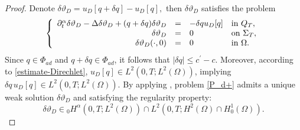 \documentclass[a4paper,12pt,reqno,natbib]{amsart}
\begin{document}
\begin{proof}
Denote $\delta \vartheta_{D}=u_D[q+\delta q]-u_D[q],$
then $\delta \vartheta_{D}$ satisfies the problem
\begin{eqnarray} \label{P_d+}
\left\{
  \begin{array}{rcll}
    \partial^\alpha _{t} \delta \vartheta_{D}   -\Delta \delta \vartheta_{D} +(q+\delta q)\delta \vartheta_{D}&=&-\delta q u_D[q]&\hbox{in}\ Q_T, \\
    \displaystyle \delta \vartheta_{D} &=&0 &\hbox{on}\  \Sigma_T, \\
    \displaystyle \delta \vartheta_{D} (\cdot,0)&=&0  &\hbox{in}\ \Omega.
  \end{array}
\right.
\end{eqnarray}
Since $q\in \Phi_{ad}$ and $q + \delta q \in \Phi_{ad}$, it follows that $|\delta q| \leq c^\prime - c$. Moreover, according to \eqref{estimate-Direchlet}, $u_D[q] \in L^2(0,T;L^2(\Omega))$, implying $\delta q \, u_D[q] \in L^2(0,T;L^2(\Omega))$. By applying \cite[Lemma 2.4]{jiang2017weak}, problem \eqref{P_d+} admits a unique weak solution $\delta\vartheta_D$ and
satisfying the regularity property:
\begin{equation}\label{es-regu}
    \delta \vartheta_{D} \in {}_0H^\alpha(0,T;L^2(\Omega))\cap L^2(0,T;H^2(\Omega)\cap H^1_0(\Omega)).
    \end{equation}



\end{proof}
\end{document}
